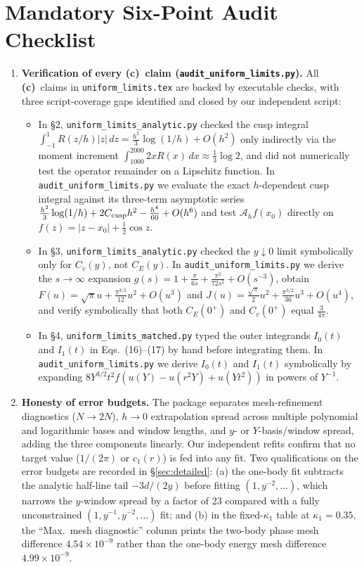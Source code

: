 \documentclass[11pt,a4paper]{article}
\newcommand{\C}{\textbf{(c)}}
\newcommand{\scr}[1]{\texttt{#1}}
\begin{document}
\section{Mandatory Six-Point Audit Checklist}

\begin{enumerate}
\item \textbf{Verification of every \C\ claim (\scr{audit\_uniform\_limits.py}).}
All \C\ claims in \scr{uniform\_limits.tex} are backed by executable checks, with
three script-coverage gaps identified and closed by our independent script:
\begin{itemize}
\item In \S2, \scr{uniform\_limits\_analytic.py} checked the cusp integral
$\int_{-1}^1 R(z/h)|z|\,dz=\frac{h^2}{3}\log(1/h)+O(h^2)$ only indirectly via the
moment increment $\int_{1000}^{2000}2xR(x)\,dx\approx\frac13\log 2$, and did not
numerically test the operator remainder on a Lipschitz function. In
\scr{audit\_uniform\_limits.py} we evaluate the exact $h$-dependent cusp integral
against its three-term asymptotic series
$\frac{h^2}{3}\log(1/h)+2C_{\rm cusp}h^2-\frac{h^4}{60}+O(h^6)$ and test
$\mathcal A_h f(x_0)$ directly on $f(z)=|z-x_0|+\frac12\cos z$.
\item In \S3, \scr{uniform\_limits\_analytic.py} checked the $y\downarrow 0$
limit symbolically only for $C_v(y)$, not $C_E(y)$. In
\scr{audit\_uniform\_limits.py} we derive the $s\to\infty$ expansion
$g(s)=1+\frac{\pi}{6s}+\frac{\pi^2}{72s^2}+O(s^{-3})$, obtain
$F(u)=\sqrt{\pi}u+\frac{\pi^{3/2}}{12}u^2+O(u^3)$ and
$J(u)=\frac{\sqrt{\pi}}{2}u^2+\frac{\pi^{3/2}}{36}u^3+O(u^4)$, and verify
symbolically that both $C_E(0^+)$ and $C_v(0^+)$ equal $\frac{3}{4\pi}$.
\item In \S4, \scr{uniform\_limits\_matched.py} typed the outer integrands
$I_0(t)$ and $I_1(t)$ in Eqs.~(16)--(17) by hand before integrating them. In
\scr{audit\_uniform\_limits.py} we derive $I_0(t)$ and $I_1(t)$ symbolically by
expanding $8Y^{3/2}t^2 f(u(Y)-u(r^2Y)+u(Yt^2))$ in powers of $Y^{-1}$.
\end{itemize}

\item \textbf{Honesty of error budgets.}
The package separates mesh-refinement diagnostics ($N\to 2N$), $h\to 0$
extrapolation spread across multiple polynomial and logarithmic bases and window
lengths, and $y$- or $Y$-basis/window spread, adding the three components
linearly. Our independent refits confirm that no target value ($1/(2\pi)$ or
$c_1(r)$) is fed into any fit. Two qualifications on the error budgets are
recorded in \S\ref{sec:detailed}: (a) the one-body fit subtracts the analytic
half-line tail $-3d/(2y)$ before fitting $(1,y^{-2},\dots)$, which narrows the
$y$-window spread by a factor of $23$ compared with a fully unconstrained
$(1,y^{-1},y^{-2},\dots)$ fit; and (b) in the fixed-$\kappa_1$ table at
$\kappa_1=0.35$, the ``Max.\ mesh diagnostic'' column prints the two-body phase
mesh difference $4.54\times 10^{-9}$ rather than the one-body energy mesh
difference $4.99\times 10^{-9}$.


\end{enumerate}
\end{document}
